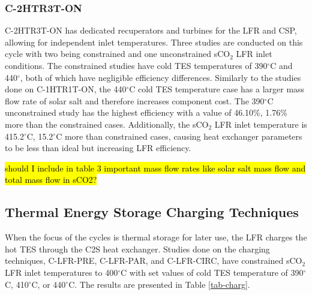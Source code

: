 \begin{paracol}{2}
\subsubsection{C-2HTR3T-ON}
C-2HTR3T-ON has dedicated recuperators and turbines for the LFR and CSP, allowing for independent inlet temperatures. Three studies are conducted on this cycle with two being constrained and one unconstrained sCO$_2$ LFR inlet conditions. The constrained studies have cold TES temperatures of 390$^{\circ}$C and 440$^{\circ}$, both of which have negligible efficiency differences. Similarly to the studies done on C-1HTR1T-ON, the 440$^{\circ}$C cold TES temperature case has a larger mass flow rate of solar salt and therefore increases component cost. The 390$^{\circ}$C unconstrained study has the highest efficiency with a value of 46.10\%, 1.76\% more than the constrained cases. Additionally, the sCO$_2$ LFR inlet temperature is 415.2$^{\circ}$C, 15.2$^{\circ}$C more than constrained cases, causing heat exchanger parameters to be less than ideal but increasing LFR efficiency. 

\hl{should I include in table 3 important mass flow rates like solar salt mass flow and total mass flow in sCO2?}

\subsection{Thermal Energy Storage Charging Techniques}

When the focus of the cycles is thermal storage for later use, the LFR charges the hot TES through the C2S heat exchanger. Studies done on the charging techniques, C-LFR-PRE, C-LFR-PAR, and C-LFR-CIRC, have constrained sCO$_2$ LFR inlet temperatures to 400$^{\circ}$C with set values of cold TES temperature of 390$^{\circ}$C, 410$^{\circ}$C, or 440$^{\circ}$C. The results are presented in Table \ref{tab-charg}. 

\end{paracol}
